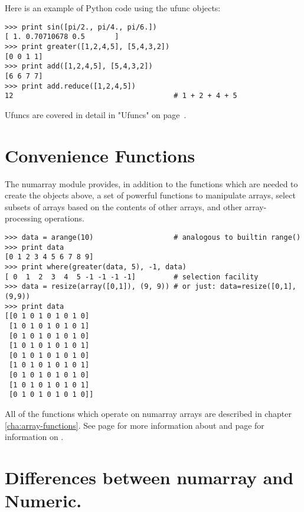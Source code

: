 Here is an example of Python code using the ufunc objects:
\begin{verbatim}
>>> print sin([pi/2., pi/4., pi/6.])
[ 1. 0.70710678 0.5       ]
>>> print greater([1,2,4,5], [5,4,3,2])
[0 0 1 1]
>>> print add([1,2,4,5], [5,4,3,2])
[6 6 7 7]
>>> print add.reduce([1,2,4,5])
12                                      # 1 + 2 + 4 + 5
\end{verbatim}
Ufuncs are covered in detail in "Ufuncs" on page~\pageref{cha:ufuncs}.


\section{Convenience Functions}
\label{sec:conv-funct}

The numarray module provides, in addition to the functions which are needed to
create the objects above, a set of powerful functions to manipulate arrays,
select subsets of arrays based on the contents of other arrays, and other
array-processing operations.
\begin{verbatim}
>>> data = arange(10)                   # analogous to builtin range()
>>> print data
[0 1 2 3 4 5 6 7 8 9]
>>> print where(greater(data, 5), -1, data)
[ 0  1  2  3  4  5 -1 -1 -1 -1]         # selection facility
>>> data = resize(array([0,1]), (9, 9)) # or just: data=resize([0,1], (9,9))
>>> print data
[[0 1 0 1 0 1 0 1 0]
 [1 0 1 0 1 0 1 0 1]
 [0 1 0 1 0 1 0 1 0]
 [1 0 1 0 1 0 1 0 1]
 [0 1 0 1 0 1 0 1 0]
 [1 0 1 0 1 0 1 0 1]
 [0 1 0 1 0 1 0 1 0]
 [1 0 1 0 1 0 1 0 1]
 [0 1 0 1 0 1 0 1 0]]
\end{verbatim}
All of the functions which operate on numarray arrays are described in chapter
\ref{cha:array-functions}.  See page \pageref{func:where} for more information
about  and page \pageref{func:resize} for
information on .

\section{Differences between numarray and Numeric.}
\label{sec:diff-numarray-numpy}

